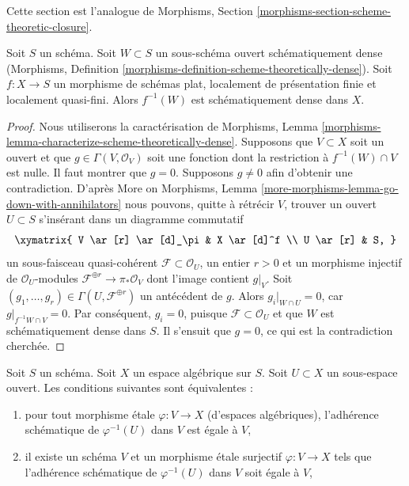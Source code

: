 \noindent
Cette section est l'analogue de
Morphisms, Section \ref{morphisms-section-scheme-theoretic-closure}.

\begin{lemma}
\label{lemma-scheme-theoretically-dense-representable}
Soit $S$ un schéma. Soit $W \subset S$ un sous-schéma ouvert
schématiquement dense
(Morphisms, Definition \ref{morphisms-definition-scheme-theoretically-dense}).
Soit $f : X \to S$ un morphisme de schémas plat, localement de
présentation finie et localement quasi-fini.
Alors $f^{-1}(W)$ est schématiquement dense dans $X$.
\end{lemma}

\begin{proof}
Nous utiliserons la caractérisation de Morphisms, Lemma
\ref{morphisms-lemma-characterize-scheme-theoretically-dense}.
Supposons que $V \subset X$ soit un ouvert et que $g \in \Gamma(V, \mathcal{O}_V)$
soit une fonction dont la restriction à $f^{-1}(W) \cap V$ est nulle.
Il faut montrer que $g = 0$. Supposons $g \not = 0$ afin d'obtenir une
contradiction. D'après
More on Morphisms, Lemma \ref{more-morphisms-lemma-go-down-with-annihilators}
nous pouvons, quitte à rétrécir $V$, trouver un ouvert $U \subset S$ s'insérant dans un
diagramme commutatif
$$
\xymatrix{
V \ar[r] \ar[d]_\pi & X \ar[d]^f \\
U \ar[r] & S,
}
$$
un sous-faisceau quasi-cohérent $\mathcal{F} \subset \mathcal{O}_U$, un entier
$r > 0$ et un morphisme injectif de $\mathcal{O}_U$-modules
$\mathcal{F}^{\oplus r} \to \pi_*\mathcal{O}_V$
dont l'image contient $g|_V$. Soit
$(g_1, \ldots, g_r) \in \Gamma(U, \mathcal{F}^{\oplus r})$ un antécédent de $g$.
Alors $g_i|_{W \cap U} = 0$, car $g|_{f^{-1}W \cap V} = 0$.
Par conséquent, $g_i = 0$, puisque $\mathcal{F} \subset \mathcal{O}_U$ et que
$W$ est schématiquement dense dans $S$.
Il s'ensuit que $g = 0$, ce qui est la contradiction cherchée.
\end{proof}

\begin{lemma}
\label{lemma-scheme-theoretically-dense}
Soit $S$ un schéma.
Soit $X$ un espace algébrique sur $S$.
Soit $U \subset X$ un sous-espace ouvert.
Les conditions suivantes sont équivalentes :
\begin{enumerate}
\item pour tout morphisme étale $\varphi : V \to X$ (d'espaces algébriques),
l'adhérence schématique de $\varphi^{-1}(U)$ dans $V$ est égale à $V$,
\item il existe un schéma $V$ et un morphisme étale surjectif
$\varphi : V \to X$ tels que l'adhérence schématique de
$\varphi^{-1}(U)$ dans $V$ soit égale à $V$,
\end{enumerate}
\end{lemma}

